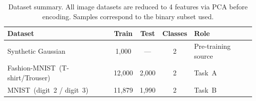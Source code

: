 \begin{table}[ht]
\centering
\caption{Dataset summary. All image datasets are reduced to 4 features via PCA before encoding. Samples correspond to the binary subset used.}
\label{tab:datasets}
\begin{tabular}{lcccl}
\toprule
\textbf{Dataset} & \textbf{Train} & \textbf{Test} & \textbf{Classes} & \textbf{Role} \\
\midrule
Synthetic Gaussian & 1{,}000 & --- & 2 & Pre-training source \\
Fashion-MNIST~(T-shirt/Trouser) & 12{,}000 & 2{,}000 & 2 & Task~A \\
MNIST~(digit~2 / digit~3) & 11{,}879 & 1{,}990 & 2 & Task~B \\
\bottomrule
\end{tabular}
\end{table}
